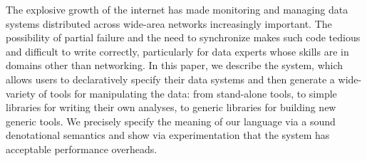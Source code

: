 The explosive growth of the internet has made monitoring and managing
data systems distributed across wide-area networks increasingly
important.  The possibility of partial failure and the need to
synchronize makes such code tedious and difficult to write correctly,
particularly for data experts whose skills are in domains other than
networking. In this paper, we describe the \padsd{} system, which
allows users to declaratively specify their data systems and then
generate a wide-variety of tools for manipulating the data: from
stand-alone tools, to simple libraries for writing their own analyses,
to generic libraries for building new generic tools.  We precisely
specify the meaning of our language via a sound denotational
semantics and show via experimentation that the system has
acceptable performance overheads.
